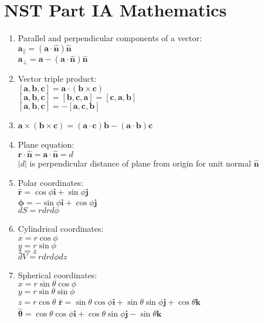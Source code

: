 \documentclass[fleqn]{article}
\author{Victor Zhao\\xz398@cam.ac.uk}
\begin{document}
\centering
\section*{NST Part IA Mathematics}
\MyAuthor

\begin{enumerate}
    \item Parallel and perpendicular components of a vector:\\
        $\bm{a}_\parallel=(\bm{a}\cdot\bm{\hat{n}})\bm{\hat{n}}$\\
        $\bm{a}_\perp=\bm{a}-(\bm{a}\cdot\bm{\hat{n}})\bm{\hat{n}}$
    \item Vector triple product:\\
        $[\bm{a},\bm{b},\bm{c}]=\bm{a}\cdot(\bm{b}\times\bm{c})$\\
        $[\bm{a},\bm{b},\bm{c}]=[\bm{b},\bm{c},\bm{a}]=[\bm{c},\bm{a},\bm{b}]$\\
        $[\bm{a},\bm{b},\bm{c}]=-[\bm{a},\bm{c},\bm{b}]$
    \item $\bm{a}\times(\bm{b}\times\bm{c})=(\bm{a}\cdot\bm{c})\bm{b}-(\bm{a}\cdot\bm{b})\bm{c}$
    \item Plane equation:\\
        $\bm{r}\cdot\bm{\hat{n}}=\bm{a}\cdot\bm{\hat{n}}=d$\\
        $|$$d$$|$ is perpendicular distance of plane from origin for unit normal $\bm{\hat{n}}$
    \item Polar coordinates:\\
        $\bm{\hat{r}}=\cos\phi\bm{i}+\sin\phi\bm{j}$\\
        $\bm{\hat{\phi}}=-\sin\phi\bm{i}+\cos\phi\bm{j}$\\
        $dS=rdrd\phi$
    \item Cylindrical coordinates:\\
        $x=r\cos\phi$\\
        $y=r\sin\phi$\\
        $z=z$\\
        $dV=rdrd\phi dz$
    \item Spherical coordinates:\\
        $x=r\sin\theta\cos\phi$\\
        $y=r\sin\theta\sin\phi$\\
        $z=r\cos\theta$\smallbreak
        $\bm{\hat{r}}=\sin\theta\cos\phi\bm{i}+\sin\theta\sin\phi\bm{j}+\cos\theta\bm{k}$\\
        $\bm{\hat{\theta}}=\cos\theta\cos\phi\bm{i}+\cos\theta\sin\phi\bm{j}-\sin\theta\bm{k}$\\

\end{enumerate}
\end{document}

